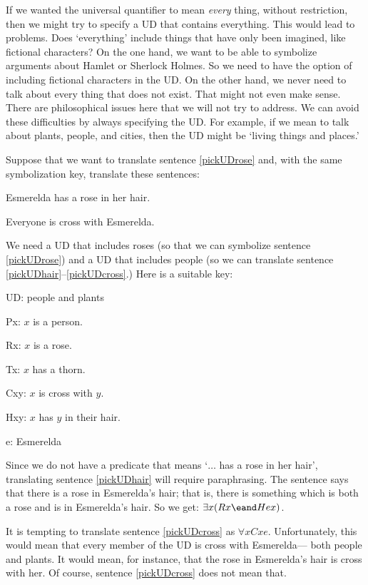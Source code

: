 If we wanted the universal quantifier to mean \emph{every} thing, without restriction, then we might try to specify a UD that contains everything. This would lead to problems. Does `everything' include things that have only been imagined, like fictional characters? On the one hand, we want to be able to symbolize arguments about Hamlet or Sherlock Holmes. So we need to have the option of including fictional characters in the UD. On the other hand, we never need to talk about every thing that does not exist. That might not even make sense. There are philosophical issues here that we will not try to address. We can avoid these difficulties by always specifying the UD. For example, if we mean to talk about plants, people, and cities, then the UD might be `living things and places.'

Suppose that we want to translate sentence \ref{pickUDrose} and, with the same symbolization key, translate these sentences:

\begin{earg}
\item[\ex{pickUDhair}] Esmerelda has a rose in her hair.
\item[\ex{pickUDcross}] Everyone is cross with Esmerelda.
\end{earg}

We need a UD that includes roses (so that we can symbolize sentence \ref{pickUDrose}) and a UD that includes people (so we can translate sentence \ref{pickUDhair}--\ref{pickUDcross}.) Here is a suitable key:
\begin{ekey}
\item[UD:] people and plants
\item[Px:] $x$ is a person.
\item[Rx:] $x$ is a rose.
\item[Tx:] $x$ has a thorn.
\item[Cxy:] $x$ is cross with $y$.
\item[Hxy:] $x$ has $y$ in their hair.
\item[e:] Esmerelda
\end{ekey}

Since we do not have a predicate that means `$\ldots$ has a rose in her hair', translating sentence \ref{pickUDhair} will require paraphrasing. The sentence says that there is a rose in Esmerelda's hair; that is, there is something which is both a rose and is in Esmerelda's hair. So we get: $\exists x(Rx \eand Hex)$.

It is tempting to translate sentence \ref{pickUDcross} as $\forall x Cxe$. Unfortunately, this would mean that every member of the UD is cross with Esmerelda--- both people and plants. It would mean, for instance, that the rose in Esmerelda's hair is cross with her. Of course, sentence \ref{pickUDcross} does not mean that.

